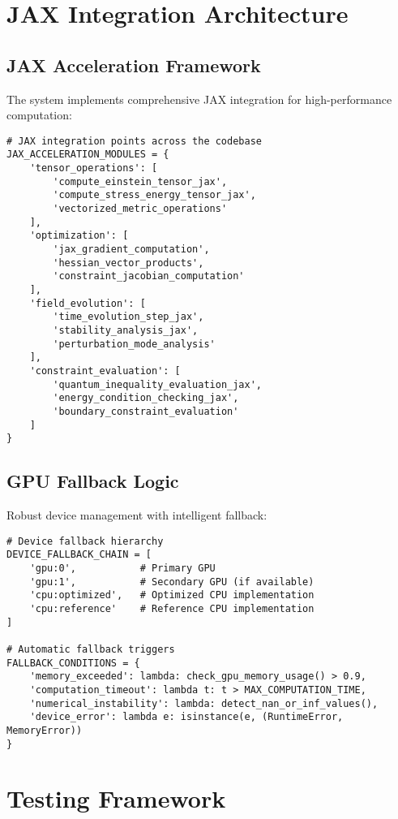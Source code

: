 \documentclass{article}
\begin{document}
\section{JAX Integration Architecture}

\subsection{JAX Acceleration Framework}

The system implements comprehensive JAX integration for high-performance computation:

\begin{lstlisting}
# JAX integration points across the codebase
JAX_ACCELERATION_MODULES = {
    'tensor_operations': [
        'compute_einstein_tensor_jax',
        'compute_stress_energy_tensor_jax',
        'vectorized_metric_operations'
    ],
    'optimization': [
        'jax_gradient_computation',
        'hessian_vector_products',
        'constraint_jacobian_computation'
    ],
    'field_evolution': [
        'time_evolution_step_jax',
        'stability_analysis_jax',
        'perturbation_mode_analysis'
    ],
    'constraint_evaluation': [
        'quantum_inequality_evaluation_jax',
        'energy_condition_checking_jax',
        'boundary_constraint_evaluation'
    ]
}
\end{lstlisting}

\subsection{GPU Fallback Logic}

Robust device management with intelligent fallback:

\begin{lstlisting}
# Device fallback hierarchy
DEVICE_FALLBACK_CHAIN = [
    'gpu:0',           # Primary GPU
    'gpu:1',           # Secondary GPU (if available)
    'cpu:optimized',   # Optimized CPU implementation
    'cpu:reference'    # Reference CPU implementation
]

# Automatic fallback triggers
FALLBACK_CONDITIONS = {
    'memory_exceeded': lambda: check_gpu_memory_usage() > 0.9,
    'computation_timeout': lambda t: t > MAX_COMPUTATION_TIME,
    'numerical_instability': lambda: detect_nan_or_inf_values(),
    'device_error': lambda e: isinstance(e, (RuntimeError, MemoryError))
}
\end{lstlisting}

\section{Testing Framework}
\end{document}

